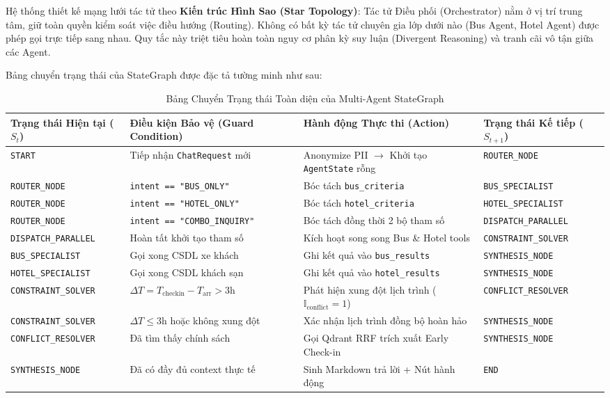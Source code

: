 Hệ thống thiết kế mạng lưới tác tử theo \textbf{Kiến trúc Hình Sao (Star Topology)}: Tác tử Điều phối (Orchestrator) nằm ở vị trí trung tâm, giữ toàn quyền kiểm soát việc điều hướng (Routing). Không có bất kỳ tác tử chuyên gia lớp dưới nào (Bus Agent, Hotel Agent) được phép gọi trực tiếp sang nhau. Quy tắc này triệt tiêu hoàn toàn nguy cơ phân kỳ suy luận (Divergent Reasoning) và tranh cãi vô tận giữa các Agent.

Bảng chuyển trạng thái của StateGraph được đặc tả tường minh như sau:

\begin{table}[h!]
\centering
\small
\begin{tabular}{|p{2.6cm}|p{3.8cm}|p{4.0cm}|p{2.8cm}|}
\hline
\textbf{Trạng thái Hiện tại ($S_t$)} & \textbf{Điều kiện Bảo vệ (Guard Condition)} & \textbf{Hành động Thực thi (Action)} & \textbf{Trạng thái Kế tiếp ($S_{t+1}$)} \\
\hline
\texttt{START} & Tiếp nhận \texttt{ChatRequest} mới & Anonymize PII $\rightarrow$ Khởi tạo \texttt{AgentState} rỗng & \texttt{ROUTER\_NODE} \\
\hline
\texttt{ROUTER\_NODE} & \texttt{intent == "BUS\_ONLY"} & Bóc tách \texttt{bus\_criteria} & \texttt{BUS\_SPECIALIST} \\
\hline
\texttt{ROUTER\_NODE} & \texttt{intent == "HOTEL\_ONLY"} & Bóc tách \texttt{hotel\_criteria} & \texttt{HOTEL\_SPECIALIST} \\
\hline
\texttt{ROUTER\_NODE} & \texttt{intent == "COMBO\_INQUIRY"} & Bóc tách đồng thời 2 bộ tham số & \texttt{DISPATCH\_PARALLEL} \\
\hline
\texttt{DISPATCH\_PARALLEL} & Hoàn tất khởi tạo tham số & Kích hoạt song song Bus \& Hotel tools & \texttt{CONSTRAINT\_SOLVER} \\
\hline
\texttt{BUS\_SPECIALIST} & Gọi xong CSDL xe khách & Ghi kết quả vào \texttt{bus\_results} & \texttt{SYNTHESIS\_NODE} \\
\hline
\texttt{HOTEL\_SPECIALIST} & Gọi xong CSDL khách sạn & Ghi kết quả vào \texttt{hotel\_results} & \texttt{SYNTHESIS\_NODE} \\
\hline
\texttt{CONSTRAINT\_SOLVER} & $\Delta T = T_{\text{checkin}} - T_{\text{arr}} > 3\text{h}$ & Phát hiện xung đột lịch trình ($\mathbb{I}_{\text{conflict}} = 1$) & \texttt{CONFLICT\_RESOLVER} \\
\hline
\texttt{CONSTRAINT\_SOLVER} & $\Delta T \le 3\text{h}$ hoặc không xung đột & Xác nhận lịch trình đồng bộ hoàn hảo & \texttt{SYNTHESIS\_NODE} \\
\hline
\texttt{CONFLICT\_RESOLVER} & Đã tìm thấy chính sách & Gọi Qdrant RRF trích xuất Early Check-in & \texttt{SYNTHESIS\_NODE} \\
\hline
\texttt{SYNTHESIS\_NODE} & Đã có đầy đủ context thực tế & Sinh Markdown trả lời + Nút hành động & \texttt{END} \\
\hline
\end{tabular}
\caption{Bảng Chuyển Trạng thái Toàn diện của Multi-Agent StateGraph}
\label{tab:state_transition_table}
\end{table}

